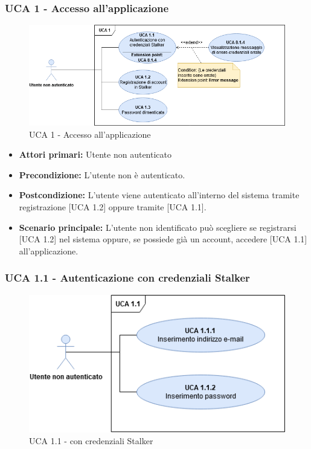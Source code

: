 \subsubsection{UCA 1 - Accesso all'applicazione}%

\begin{figure}[h]
  \centering
    \includegraphics[scale=0.5]{Sezioni/UseCase/Immagini/UCA1.png}
  \caption{UCA 1 - Accesso all'applicazione}
\end{figure}

\begin{itemize}
\item \textbf{Attori primari:} Utente non autenticato
\item \textbf{Precondizione:} L'utente non è autenticato.
\item \textbf{Postcondizione:} L'utente viene autenticato all'interno del sistema tramite registrazione [UCA 1.2] oppure tramite  [UCA 1.1].
\item \textbf{Scenario principale:} L'utente non identificato può scegliere se registrarsi [UCA 1.2] nel sistema oppure, se possiede già un account, accedere [UCA 1.1] all'applicazione. %
\end{itemize}

\subsubsection{UCA 1.1 - Autenticazione con credenziali Stalker}%

\begin{figure}[h]
  \centering
    \includegraphics[scale=0.5, center]{Sezioni/UseCase/Immagini/UCA1.1.png}
  \caption{UCA 1.1 -  con credenziali Stalker}
\end{figure}

